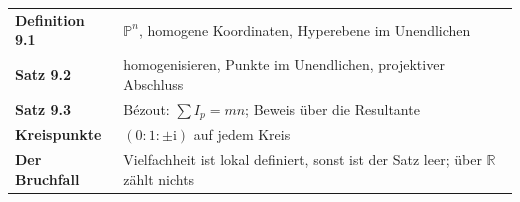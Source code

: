 \begin{merksatz}
\begin{center}
\renewcommand{\arraystretch}{1.5}
\begin{tabular}{@{}P{3.0cm}P{5.6cm}@{}}
\toprule
\textbf{Definition 9.1} & $\mathbb P^{n}$, homogene Koordinaten, Hyperebene im Unendlichen\\
\textbf{Satz 9.2} & homogenisieren, Punkte im Unendlichen, projektiver Abschluss\\
\textbf{Satz 9.3} & Bézout: $\sum I_p = mn$; Beweis über die Resultante\\
\textbf{Kreispunkte} & $(0 : 1 : \pm\mathrm i)$ auf jedem Kreis\\
\textbf{Der Bruchfall} & Vielfachheit ist lokal definiert, sonst ist der Satz leer; über $\mathbb R$ zählt nichts\\
\bottomrule
\end{tabular}
\end{center}

\begin{center}
\begin{minipage}{0.88\textwidth}
\end{minipage}
\end{center}
\end{merksatz}

